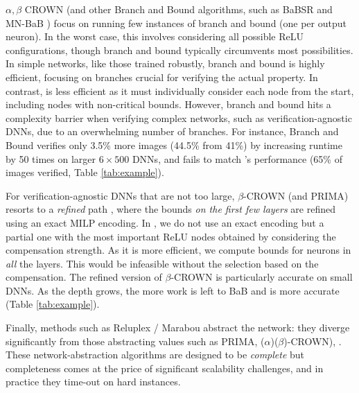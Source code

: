 $\alpha,\beta$ CROWN \cite{crown} (and other Branch and Bound algorithms, such as BaBSR \cite{BaB} and MN-BaB \cite{ferrari2022complete})  focus on running few instances of branch and bound (one per output neuron). In the worst case, this involves considering all possible ReLU configurations, though branch and bound typically circumvents most possibilities. In simple networks, like those trained robustly, branch and bound is highly efficient, focusing on branches crucial for verifying the actual property. In contrast, {\CMP} is less efficient as it must individually consider each node from the start, including nodes with non-critical bounds. However, branch and bound hits a complexity barrier when verifying complex networks, such as verification-agnostic DNNs, due to an overwhelming number of branches. For instance, Branch and Bound verifies only 3.5\% more images (44.5\% from 41\%) by increasing runtime by 50 times on larger $6 \times 500$ DNNs, and fails to match {\CMP}'s performance (65\% of images verified, Table \ref{tab:example}). 


For verification-agnostic DNNs that are not too large,  $\beta$-CROWN (and PRIMA) resorts to a {\em refined} path \cite{MILP2}, where the bounds {\em on the first few layers} are refined using an exact MILP encoding. In {\CMP}, we do not use an exact encoding but a partial one with the most important ReLU nodes obtained by considering the compensation strength. As it is more efficient, we compute bounds for neurons in {\em all} the layers. This would be infeasible without the selection based on the compensation. The refined version of $\beta$-CROWN is particularly accurate on small DNNs. As the depth grows, the more work is left to BaB and \CMP is more accurate (Table \ref{tab:example}).

Finally, methods such as Reluplex / Marabou \cite{Reluplex,katz2019marabou}  abstract the network: they diverge significantly from those abstracting values such as PRIMA, ($\alpha$)($\beta$)-CROWN)\cite{prima,crown}, \CMP. These network-abstraction algorithms are designed to be {\em complete} but completeness comes at the price of significant scalability challenges, and in practice they time-out on hard instances.